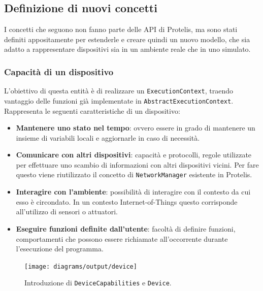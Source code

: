 \subsection{Definizione di nuovi concetti}
I concetti che seguono non fanno parte delle API di Protelis, ma sono stati
definiti appositamente per estenderle e creare quindi un nuovo modello, che sia
adatto a rappresentare dispositivi sia in un ambiente reale che in uno simulato.

\subsubsection{Capacità di un dispositivo}
L'obiettivo di questa entità è di realizzare un \texttt{ExecutionContext},
traendo vantaggio delle funzioni già implementate in
\texttt{AbstractExecutionContext}. Rappresenta le seguenti caratteristiche di un
dispositivo:
\begin{itemize}
\item \textbf{Mantenere uno stato nel tempo}: ovvero essere in grado di
  mantenere un insieme di variabili locali e aggiornarle in caso di necessità.
\item \textbf{Comunicare con altri dispositivi}: capacità e protocolli, regole
  utilizzate per effettuare uno scambio di informazioni con altri dispositivi
  vicini. Per fare questo viene riutilizzato il concetto di
  \texttt{NetworkManager} esistente in Protelis.
\item \textbf{Interagire con l'ambiente}: possibilità di interagire con il
  contesto da cui esso è circondato. In un contesto Internet-of-Things questo
  corrisponde all'utilizzo di sensori o attuatori.
\item \textbf{Eseguire funzioni definite dall'utente}: facoltà di definire
  funzioni, comportamenti che possono essere richiamate all'occorrente durante
  l'esecuzione del programma.
\end{itemize}

\begin{figure}
  \centering
  \texttt{[image: diagrams/output/device]}
    \caption{Introduzione di \texttt{DeviceCapabilities} e \texttt{Device}.}
  \label{fig:uml-device}
\end{figure}
%
